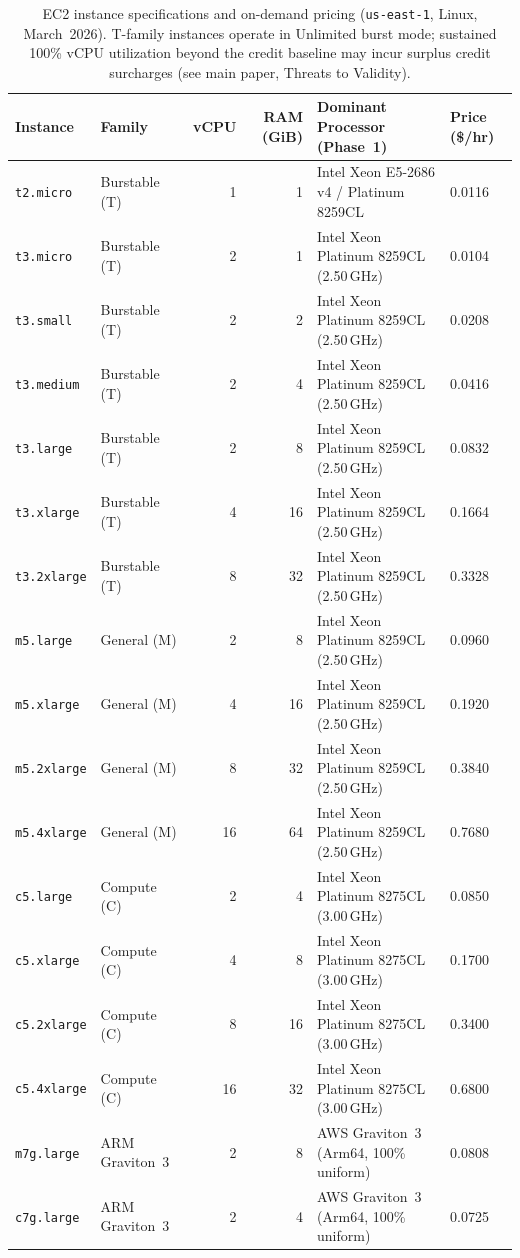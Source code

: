 \documentclass[conference]{IEEEtran}
\begin{document}
\begin{table}[!htbp]
\centering
\caption{EC2 instance specifications and on-demand pricing (\texttt{us-east-1},
Linux, March~2026). T-family instances operate in Unlimited burst mode; sustained
100\% vCPU utilization beyond the credit baseline may incur surplus credit
surcharges (see main paper, Threats to Validity).}
\label{tab:app_instance_specs}
\small
\begin{tabular}{llrrll}
\toprule
\textbf{Instance} & \textbf{Family} & \textbf{vCPU} & \textbf{RAM (GiB)}
  & \textbf{Dominant Processor (Phase~1)} & \textbf{Price (\$/hr)} \\
\midrule
\texttt{t2.micro}    & Burstable (T) & 1  & 1   & Intel Xeon E5-2686 v4 / Platinum 8259CL & 0.0116 \\
\texttt{t3.micro}    & Burstable (T) & 2  & 1   & Intel Xeon Platinum 8259CL (2.50\,GHz)  & 0.0104 \\
\texttt{t3.small}    & Burstable (T) & 2  & 2   & Intel Xeon Platinum 8259CL (2.50\,GHz)  & 0.0208 \\
\texttt{t3.medium}   & Burstable (T) & 2  & 4   & Intel Xeon Platinum 8259CL (2.50\,GHz)  & 0.0416 \\
\texttt{t3.large}    & Burstable (T) & 2  & 8   & Intel Xeon Platinum 8259CL (2.50\,GHz)  & 0.0832 \\
\texttt{t3.xlarge}   & Burstable (T) & 4  & 16  & Intel Xeon Platinum 8259CL (2.50\,GHz)  & 0.1664 \\
\texttt{t3.2xlarge}  & Burstable (T) & 8  & 32  & Intel Xeon Platinum 8259CL (2.50\,GHz)  & 0.3328 \\
\midrule
\texttt{m5.large}    & General (M)   & 2  & 8   & Intel Xeon Platinum 8259CL (2.50\,GHz)  & 0.0960 \\
\texttt{m5.xlarge}   & General (M)   & 4  & 16  & Intel Xeon Platinum 8259CL (2.50\,GHz)  & 0.1920 \\
\texttt{m5.2xlarge}  & General (M)   & 8  & 32  & Intel Xeon Platinum 8259CL (2.50\,GHz)  & 0.3840 \\
\texttt{m5.4xlarge}  & General (M)   & 16 & 64  & Intel Xeon Platinum 8259CL (2.50\,GHz)  & 0.7680 \\
\midrule
\texttt{c5.large}    & Compute (C)   & 2  & 4   & Intel Xeon Platinum 8275CL (3.00\,GHz)  & 0.0850 \\
\texttt{c5.xlarge}   & Compute (C)   & 4  & 8   & Intel Xeon Platinum 8275CL (3.00\,GHz)  & 0.1700 \\
\texttt{c5.2xlarge}  & Compute (C)   & 8  & 16  & Intel Xeon Platinum 8275CL (3.00\,GHz)  & 0.3400 \\
\texttt{c5.4xlarge}  & Compute (C)   & 16 & 32  & Intel Xeon Platinum 8275CL (3.00\,GHz)  & 0.6800 \\
\midrule
\texttt{m7g.large}   & ARM Graviton~3 & 2 & 8  & AWS Graviton~3 (Arm64, 100\% uniform)   & 0.0808 \\
\texttt{c7g.large}   & ARM Graviton~3 & 2 & 4  & AWS Graviton~3 (Arm64, 100\% uniform)   & 0.0725 \\
\bottomrule
\end{tabular}
\end{table}
\end{document}

